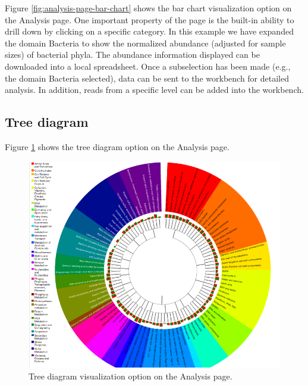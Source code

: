 \documentclass[12pt,fullpage]{report}
\begin{document}
Figure \ref{fig:analysis-page-bar-chart} shows the bar chart visualization option on the Analysis page. One important property of the page is the built-in ability to drill down by clicking on a specific category. In this example we have expanded the domain Bacteria to show the normalized abundance (adjusted for sample sizes) of bacterial phyla. The abundance information displayed can be downloaded into a local spreadsheet. Once a subselection has been made (e.g., the domain Bacteria selected), data can be sent to the workbench for detailed analysis.
In addition, reads from a specific level can be added into the workbench.
\subsection{Tree diagram}

Figure \ref{fig:analysis-page-radial-tree}
shows the tree diagram option on the Analysis page.

\begin{figure}
\begin{center}
\includegraphics[width=6in]{Images/analysis-page-radial-tree.png}
\end{center}
\caption{
Tree diagram visualization option on the Analysis page.
}
\label{fig:analysis-page-radial-tree}
\end{figure}
\end{document}
